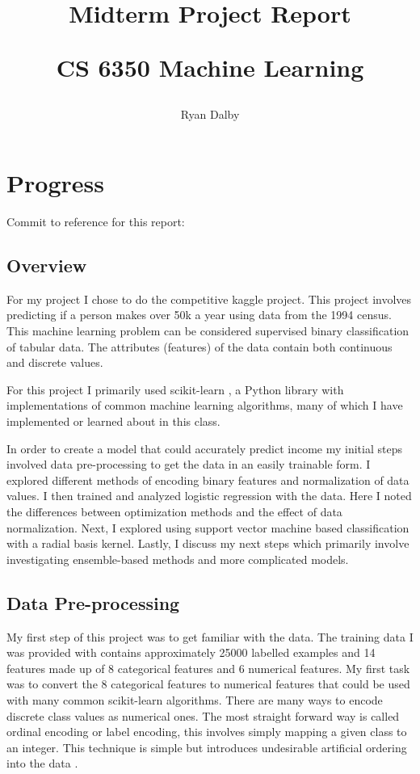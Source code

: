 \documentclass[11pt]{article}
\title{
    Midterm Project Report

    \large{
    CS 6350 Machine Learning
    }  
    
}
\author{
    Ryan Dalby
}
\date{\displaydate{date}}
\begin{document}
\maketitle

\section*{Progress}
Commit to reference for this report: \url{}

\subsection*{Overview}

For my project I chose to do the competitive kaggle project.
This project involves predicting if a person makes over 50k a year using data from the 1994 census. 
This machine learning problem can be considered supervised binary classification of tabular data. 
The attributes (features) of the data contain both continuous and discrete values.

For this project I primarily used scikit-learn \cite{noauthor_scikit-learn_nodate}, a Python library with implementations of common machine learning algorithms, many of which I have implemented or learned about in this class.

In order to create a model that could accurately predict income my initial steps involved data pre-processing to get the data in an easily trainable form.
I explored different methods of encoding binary features and normalization of data values.
I then trained and analyzed logistic regression with the data. 
Here I noted the differences between optimization methods and the effect of data normalization.
Next, I explored using support vector machine based classification with a radial basis kernel.
Lastly, I discuss my next steps which primarily involve investigating ensemble-based methods and more complicated models.

\subsection*{Data Pre-processing}
My first step of this project was to get familiar with the data.
The training data I was provided with contains approximately 25000 labelled examples and 14 features made up of 8 categorical features and 6 numerical features.
My first task was to convert the 8 categorical features to numerical features that could be used with many common scikit-learn algorithms.
There are many ways to encode discrete class values as numerical ones.
The most straight forward way is called ordinal encoding or label encoding, this involves simply mapping a given class to an integer.
This technique is simple but introduces undesirable artificial ordering into the data \cite{hancock_survey_2020}.
\end{document}
